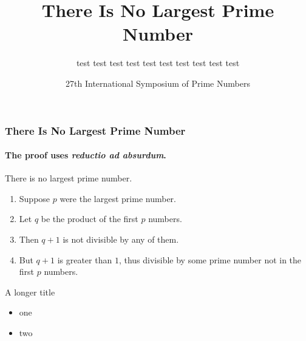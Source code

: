 \documentclass[aspectratio=169]{beamer}
\title{There Is No Largest Prime Number}
\date[ISPN ’80]{27th International Symposium of Prime Numbers}
\author[Euclid]{test test test test test test test test test test}
\begin{document}
\begin{frame}
\titlepage
\end{frame}


\begin{frame}
\frametitle{There Is No Largest Prime Number}
\framesubtitle{The proof uses \textit{reductio ad absurdum}.}
\begin{theorem}
There is no largest prime number. \end{theorem}
\begin{enumerate}
\item<1-| alert@1> Suppose $p$ were the largest prime number.
\item<2-> Let $q$ be the product of the first $p$ numbers.
\item<3-> Then $q+1$ is not divisible by any of them.
\item<1-> But $q + 1$ is greater than $1$, thus divisible by some prime
number not in the first $p$ numbers.
\end{enumerate}
\end{frame}

\begin{frame}{A longer title}
\begin{itemize}
\item one
\item two
\end{itemize}
\end{frame}
\end{document}
